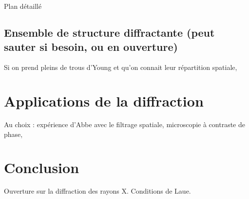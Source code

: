 \begin{reportBlock}{Plan détaillé}
  \subsection{Ensemble de structure diffractante (peut sauter si besoin, ou en ouverture)}
  Si on prend pleins de trous d'Young et qu'on connait leur répartition spatiale, 

  \section{Applications de la diffraction}
  Au choix : expérience d'Abbe avec le filtrage spatiale, microscopie à contraste de phase,
  \section{}

  \section*{Conclusion}
  Ouverture sur la diffraction des rayons X. Conditions de Laue.

\end{reportBlock}